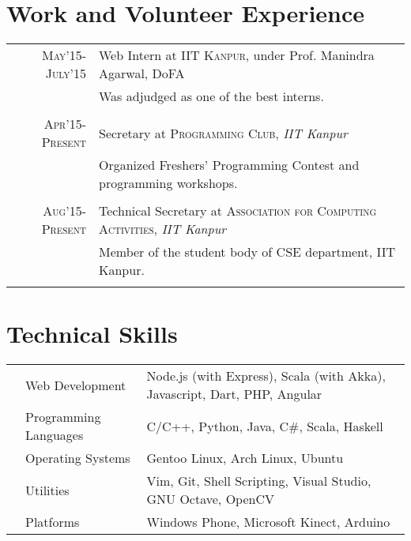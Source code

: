 \documentclass[11pt,a4paper]{article}
\begin{document}
\vspace{-0.4cm}
\section*{Work and Volunteer Experience}
\vspace{-0.2cm}
\bgroup
\def\arraystretch{0.6}
\begin{tabular}{r|p{20cm}}
\textsc{May'15-July'15} & Web Intern at \textsc{IIT Kanpur}, under Prof. Manindra Agarwal, DoFA\\
                        &\footnotesize{Was adjudged as one of the best interns.}\\\multicolumn{2}{c}{} \\
\textsc{Apr'15-Present} & Secretary at \textsc{Programming Club}, \emph{IIT Kanpur}\\
&\footnotesize{Organized Freshers' Programming Contest and programming workshops.}\\\multicolumn{2}{c}{} \\

\textsc{Aug'15-Present} & Technical Secretary at \textsc{Association for Computing Activities}, \emph{IIT Kanpur}\\
&\footnotesize{Member of the student body of CSE department, IIT Kanpur.}\\\multicolumn{2}{c}{} \\

\end{tabular}
\egroup

\vspace{-0.4cm}
\section*{Technical Skills}
\vspace{-0.2cm}
\begin{tabular}{L{0.05cm} L{5cm} l}
  &Web Development 	        &Node.js (with Express), Scala (with Akka), Javascript, Dart, PHP, Angular\\
&Programming Languages      &C/C++, Python, Java, C\#, Scala, Haskell\\
&Operating Systems	        &Gentoo Linux, Arch Linux, Ubuntu\\
&Utilities                  &Vim, Git, Shell Scripting, Visual Studio, GNU Octave, OpenCV\\
&Platforms                  &Windows Phone, Microsoft Kinect, Arduino\\

\end{tabular}
\end{document}
